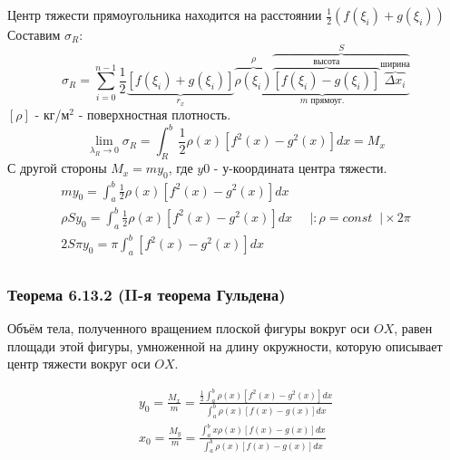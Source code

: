 \documentclass[12pt]{article}
\begin{document}
\begin{enumerate}
        Центр тяжести прямоугольника находится на расстоянии $\frac{1}{2}(f(\xi_i) + g(\xi_i))$\\
        Составим $\sigma_R$:
        \[ \sigma_R=\sum_{i=0}^{n-1}\frac{1}{2} \underbrace{[f(\xi_i)+g(\xi_i)]}_{r_x} \underbrace{\overbrace{\rho(\xi_i)}^{\rho}\overbrace{\overbrace{[f(\xi_i)-g(\xi_i)]}^{\text{высота}}\overbrace{\Delta x_i}^{\text{ширина}}}^{S}}_{m \text{ прямоуг.}} \]
        $[\rho]$ - кг/$\text{м}^2$ - поверхностная плотность.
        \[ \lim_{\lambda_R \to 0} \sigma_R = \int_{R}^{b}\frac{1}{2}\rho (x) [f^2(x)-g^2(x)]dx=M_x \]
        С другой стороны $M_x=my_0$, где $y0$ - $у$-координата центра тяжести.\\
        \begin{gather*}
            my_0=\int_{a}^{b}\frac{1}{2}\rho (x)[f^2(x)-g^2(x)]dx\\
            \rho Sy_0=\int_{a}^{b}\frac{1}{2}\rho (x)[f^2(x)-g^2(x)]dx \;\;\;\;\; \Big| : \rho=const \;\; \Big| \times 2\pi\\
            2S\pi y_0=\pi \int_{a}^{b} [f^2(x)-g^2(x)]dx\\
        \end{gather*}
        \subsubsection*{Теорема 6.13.2 (II-я теорема Гульдена)}\label{th:6.13.2}
        Объём тела, полученного вращением плоской фигуры вокруг оси $OX$, равен площади этой фигуры, умноженной на длину окружности, которую описывает центр тяжести вокруг оси $OX$.\par\noindent
        \begin{gather*}
            y_0=\frac{M_x}{m}=\frac{\frac{1}{2}\int_{a}^{b}\rho (x)[f^2(x)-g^2(x)]dx}{\int_{a}^{b}\rho(x)[f(x)-g(x)]dx}\\
            x_0=\frac{M_y}{m}=\frac{\int_{a}^{b}x\rho (x)[f(x)-g(x)]dx}{\int_{a}^{b}\rho (x)[f(x)-g(x)]dx}
        \end{gather*}
    \end{enumerate}
\end{document}

